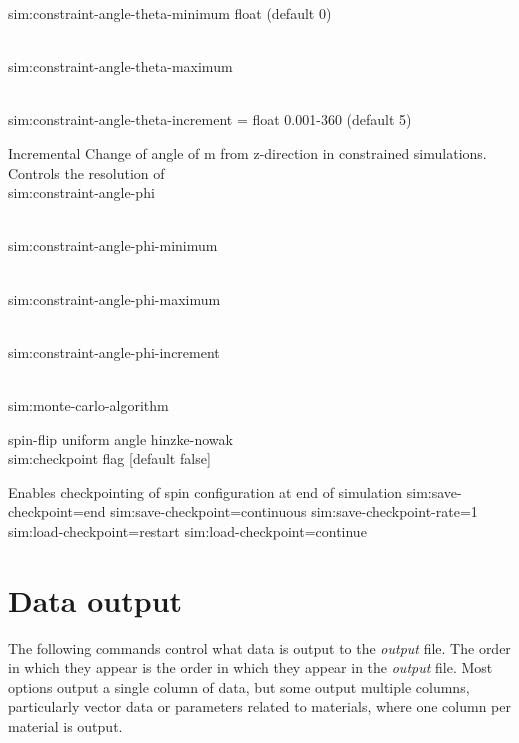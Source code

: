 {\zicf  sim:constraint-angle-theta-minimum float (default 0)}\\
    
{\zicf  sim:constraint-angle-theta-maximum}\\

{\zicf  sim:constraint-angle-theta-increment = float 0.001-360 (default 5)}
    Incremental Change of angle of m from z-direction in constrained simulations. Controls the resolution of \\

{\zicf sim:constraint-angle-phi}\\

{\zicf sim:constraint-angle-phi-minimum}\\

{\zicf sim:constraint-angle-phi-maximum}\\

{\zicf sim:constraint-angle-phi-increment}\\

{\zicf sim:monte-carlo-algorithm}
      spin-flip
      uniform
      angle
      hinzke-nowak\\
      
{\zicf sim:checkpoint flag [default false]}
    Enables checkpointing of spin configuration at end of simulation
sim:save-checkpoint=end
sim:save-checkpoint=continuous
sim:save-checkpoint-rate=1
sim:load-checkpoint=restart
sim:load-checkpoint=continue\\


\section*{Data output}
The following commands control what data is output to the \textit{output} file. The order in which they appear is the order in which they appear in the \textit{output} file. Most options output a single column of data, but some output multiple columns, particularly vector data or parameters related to materials, where one column per material is output.\\


